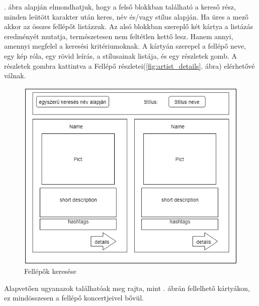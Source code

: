 
. ábra alapján elmondhatjuk, hogy a felső blokkban található a kereső rész, minden leütött karakter után keres, név és/vagy stílus alapján. Ha üres a mező akkor az összes fellépőt listázzuk. Az alsó blokkban szereplő két kártya a listázás eredményét mutatja, természetesen nem feltétlen kettő lesz. Hanem annyi, amennyi megfelel a keresési kritériumoknak. A kártyán szerepel a fellépő neve, egy kép róla, egy rövid leírás, a stílusainak listája, és egy részletek gomb. A részletek gombra kattintva a Fellépő részletei(\ref{fig:artist_details}. ábra) elérhetővé válnak.

\begin{figure}
\centering
\includegraphics[scale=0.5]{kepek/artist_search.jpg}
\caption{Fellépők keresése}
\label{fig:artist_search}
\end{figure}


Alapvetően ugyanazok találhatóak meg rajta, mint . ábrán fellelhető kártyákon, ez mindösszesen a fellépő koncertjeivel bővül.

